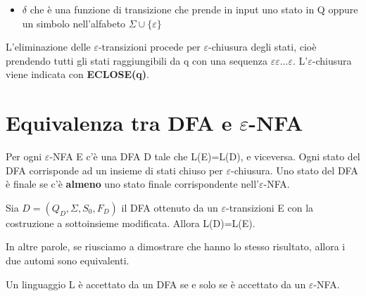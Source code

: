 \begin{itemize}
\item \textbf{$\delta$} che è una funzione di transizione che prende in input uno 
stato in Q oppure un simbolo nell'alfabeto $\Sigma \cup \{\varepsilon\}$
\end{itemize}

L'eliminazione delle $\varepsilon$-transizioni procede per $\varepsilon$-chiusura 
degli stati, cioè prendendo tutti gli stati raggiungibili da q con una sequenza $
\varepsilon\varepsilon... \varepsilon$. L'$\varepsilon$-chiusura viene indicata con 
\textbf{ECLOSE(q)}.

\section{Equivalenza tra DFA e $\varepsilon$\textrm{-NFA}}
Per ogni $\varepsilon$\textrm{-NFA} E c'è una DFA D tale che L(E)=L(D), e viceversa.
Ogni stato del DFA corrisponde ad un insieme di stati chiuso per 
$\varepsilon$\textrm{-chiusura}.
Uno stato del DFA è finale se c'è \textbf{almeno} uno stato finale corrispondente 
nell'$\varepsilon$\textrm{-NFA}.


\begin{thm}
Sia $D=(Q_D, \Sigma, S_0, F_D)$ il DFA ottenuto da un $\varepsilon$\textrm{-transizioni}
E con la costruzione a sottoinsieme modificata. Allora L(D)=L(E).
\end{thm}

In altre parole, se riusciamo a dimostrare che hanno lo stesso risultato, allora i due
automi sono equivalenti.

\begin{thm}
Un linguaggio L è accettato da un DFA se e solo se è accettato da un 
$\varepsilon$\textrm{-NFA}.
\end{thm}

















